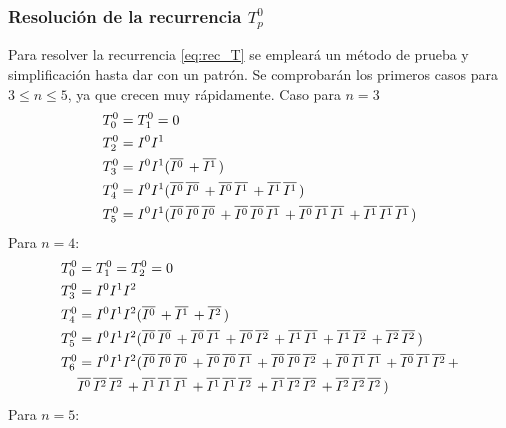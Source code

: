 \subsubsection{Resolución de la recurrencia $T^0_p$}
Para resolver la recurrencia \eqref{eq:rec_T} se empleará un método de prueba y 
simplificación hasta dar con un patrón. Se comprobarán los primeros casos para 
$3 \leq n \leq 5$, ya que crecen muy rápidamente.
%
Caso para $n=3$
%
\begin{equation}
\label{eq:rec_T3}
\begin{split}
	T^0_0 &= T^0_1 = 0 \\
	T^0_2 &= I^0I^1 \\
	T^0_3 &= I^0I^1(\NI 0 + \NI 1 ) \\
	T^0_4 &= I^0I^1(\NI 0 \NI 0 + \NI 0 \NI 1  + \NI 1 \NI 1 ) \\
	T^0_5 &= I^0I^1(\NI 0 \NI 0 \NI 0 + \NI 0 \NI 0 \NI 1  + \NI 0 \NI 1 \NI 1 + 
\NI 1 \NI 1 \NI 1) \\
\end{split}
\end{equation}
%
Para $n=4$:
%
\begin{equation}
\begin{split}
	T^0_0 &= T^0_1 = T^0_2 = 0 \\
	T^0_3 &= I^0I^1I^2 \\
	T^0_4 &= I^0I^1I^2 (\NI 0 + \NI 1 + \NI 2) \\
	T^0_5 &= I^0I^1I^2 (
		\NI 0 \NI 0 +
		\NI 0 \NI 1 +
		\NI 0 \NI 2 +
		\NI 1 \NI 1 +
		\NI 1 \NI 2 +
		\NI 2 \NI 2) \\
	T^0_6 &= I^0I^1I^2 (
		\NI 0 \NI 0 \NI 0 +
		\NI 0 \NI 0 \NI 1 +
		\NI 0 \NI 0 \NI 2 +
		\NI 0 \NI 1 \NI 1 +
		\NI 0 \NI 1 \NI 2 + \\
		& \NI 0 \NI 2 \NI 2 +
		\NI 1 \NI 1 \NI 1 +
		\NI 1 \NI 1 \NI 2 +
		\NI 1 \NI 2 \NI 2 +
		\NI 2 \NI 2 \NI 2) \\
\end{split}
\end{equation}
%
Para $n=5$:
%
